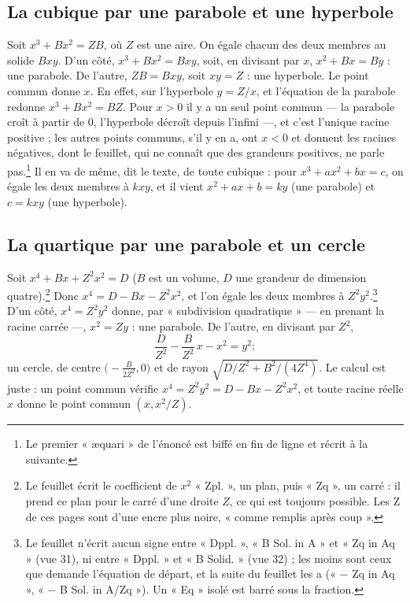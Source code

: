 \documentclass[11pt,a4paper]{article}
\begin{document}
\subsection*{La cubique par une parabole et une hyperbole}

Soit $x^3 + Bx^2 = ZB$, où $Z$ est une aire. On égale chacun des deux membres
au solide $Bxy$. D'un côté, $x^3 + Bx^2 = Bxy$, soit, en divisant par $x$,
$x^2 + Bx = By$ : une parabole. De l'autre, $ZB = Bxy$, soit $xy = Z$ : une
hyperbole. Le point commun donne $x$. En effet, sur l'hyperbole $y = Z/x$, et
l'équation de la parabole redonne $x^3 + Bx^2 = BZ$. Pour $x > 0$ il y a un
seul point commun — la parabole croît à partir de $0$, l'hyperbole décroît
depuis l'infini —, et c'est l'unique racine positive ; les autres points
communs, s'il y en a, ont $x < 0$ et donnent les racines négatives, dont le
feuillet, qui ne connaît que des grandeurs positives, ne parle
pas.\footnote{Le premier « æquari » de l'énoncé est biffé en fin de ligne et
récrit à la suivante.} Il en va de même, dit le texte, de toute cubique : pour
$x^3 + ax^2 + bx = c$, on égale les deux membres à $kxy$, et il vient
$x^2 + ax + b = ky$ (une parabole) et $c = kxy$ (une hyperbole).

\subsection*{La quartique par une parabole et un cercle}

Soit $x^4 + Bx + Z^2x^2 = D$ ($B$ est un volume, $D$ une grandeur de dimension
quatre).\footnote{Le feuillet écrit le coefficient de $x^2$ « Zpl. », un plan,
puis « Zq », un carré : il prend ce plan pour le carré d'une droite $Z$, ce
qui est toujours possible. Les Z de ces pages sont d'une encre plus noire,
« comme remplis après coup ».} Donc $x^4 = D - Bx - Z^2x^2$, et l'on égale les
deux membres à $Z^2y^2$.\footnote{Le feuillet n'écrit aucun signe entre
« Dppl. », « B Sol. in A » et « Zq in Aq » (vue 31), ni entre « Dppl. » et
« B Solid. » (vue 32) ; les moins sont ceux que demande l'équation de départ, et
la suite du feuillet les a (« $-$ Zq in Aq », « $-$ B Sol. in A/Zq »). Un
« Eq » isolé est barré sous la fraction.} D'un côté, $x^4 = Z^2y^2$ donne, par
« subdivision quadratique » — en prenant la racine carrée —, $x^2 = Zy$ : une
parabole. De l'autre, en divisant par $Z^2$,
\[ \frac{D}{Z^2} - \frac{B}{Z^2}\,x - x^2 = y^2 : \]
un cercle, de centre $\bigl(-\tfrac{B}{2Z^2}, 0\bigr)$ et de rayon
$\sqrt{D/Z^2 + B^2/(4Z^4)}$. Le calcul est juste : un point commun vérifie
$x^4 = Z^2y^2 = D - Bx - Z^2x^2$, et toute racine réelle $x$ donne le point
commun $(x, x^2/Z)$.
\end{document}
